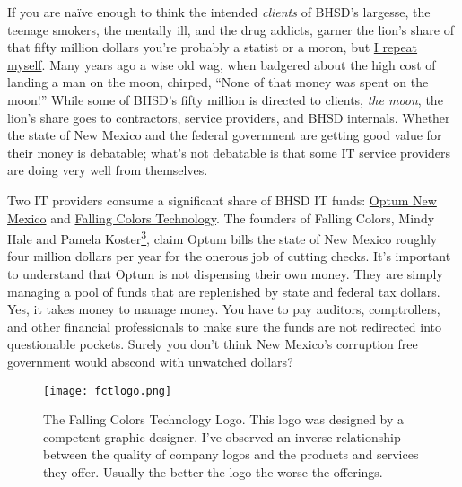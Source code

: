 If you are naïve enough to think the intended \emph{clients} of BHSD's
largesse, the teenage smokers, the mentally ill, and the drug addicts,
garner the lion's share of that fifty million dollars you're probably a
statist or a moron, but
\href{http://www.twainquotes.com/Congress.html}{I repeat myself}. Many
years ago a wise old wag, when badgered about the high cost of landing a
man on the moon, chirped, ``None of that money was spent on the moon!''
While some of BHSD's fifty million is directed to clients, \emph{the
moon}, the lion's share goes to contractors, service providers, and BHSD
internals. Whether the state of New Mexico and the federal government
are getting good value for their money is debatable; what's not
debatable is that some IT service providers are doing very well from
themselves.

Two IT providers consume a significant share of BHSD IT funds:
\href{https://www.optumhealthnewmexico.com/}{Optum New Mexico} and
\href{https://www.linkedin.com/company/falling-colors-technology}{Falling
Colors Technology}. The founders of Falling Colors, Mindy Hale and
Pamela Koster\protect\hyperlink{fn3}{\textsuperscript{3}}, claim Optum
bills the state of New Mexico roughly four million dollars per year for
the onerous job of cutting checks. It's important to understand that
Optum is not dispensing their own money. They are simply managing a pool
of funds that are replenished by state and federal tax dollars. Yes, it
takes money to manage money. You have to pay auditors, comptrollers, and
other financial professionals to make sure the funds are not redirected
into questionable pockets. Surely you don't think New Mexico's
corruption free government would abscond with unwatched dollars?


\begin{SCfigure}[30]
 \centering
  \texttt{[image: fctlogo.png]}
  \caption{The Falling Colors Technology Logo. This logo was designed by a
competent graphic designer. I've observed an inverse relationship
between the quality of company logos and the products and services they
offer. Usually the better the logo the worse the
offerings.}
  \label{fig:5261X1}
\end{SCfigure}


